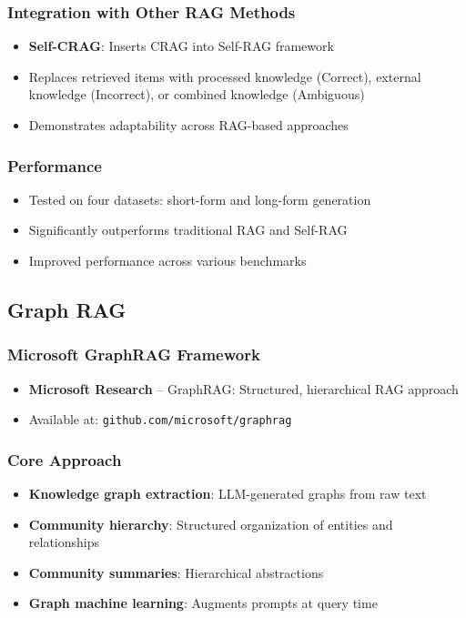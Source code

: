 \documentclass[11pt,letterpaper]{article}
\begin{document}
\subsubsection{Integration with Other RAG Methods}
\begin{itemize}[leftmargin=*]
    \item \textbf{Self-CRAG}: Inserts CRAG into Self-RAG framework
    \item Replaces retrieved items with processed knowledge (Correct), external knowledge (Incorrect), or combined knowledge (Ambiguous)
    \item Demonstrates adaptability across RAG-based approaches
\end{itemize}

\subsubsection{Performance}
\begin{itemize}[leftmargin=*]
    \item Tested on four datasets: short-form and long-form generation
    \item Significantly outperforms traditional RAG and Self-RAG
    \item Improved performance across various benchmarks
\end{itemize}

\subsection{Graph RAG}

\subsubsection{Microsoft GraphRAG Framework}
\begin{itemize}[leftmargin=*]
    \item \textbf{Microsoft Research} -- GraphRAG: Structured, hierarchical RAG approach
    \item Available at: \texttt{github.com/microsoft/graphrag}
\end{itemize}

\subsubsection{Core Approach}
\begin{itemize}[leftmargin=*]
    \item \textbf{Knowledge graph extraction}: LLM-generated graphs from raw text
    \item \textbf{Community hierarchy}: Structured organization of entities and relationships
    \item \textbf{Community summaries}: Hierarchical abstractions
    \item \textbf{Graph machine learning}: Augments prompts at query time
\end{itemize}
\end{document}
